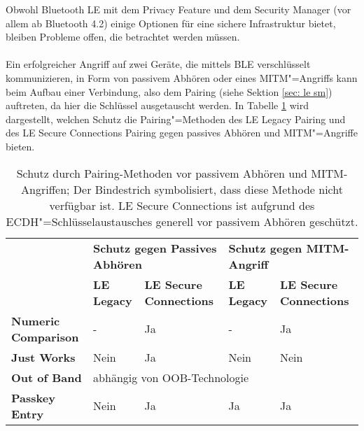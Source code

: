 Obwohl Bluetooth LE mit dem Privacy Feature und dem Security Manager (vor allem ab Bluetooth 4.2) einige Optionen für eine sichere Infrastruktur bietet, bleiben Probleme offen, die betrachtet werden müssen.
\\\\
Ein erfolgreicher Angriff auf zwei Geräte, die mittels BLE verschlüsselt kommunizieren, in Form von passivem Abhören oder eines MITM"=Angriffs kann beim Aufbau einer Verbindung, also dem Pairing (siehe Sektion \ref{sec: le sm}) auftreten, da hier die Schlüssel ausgetauscht werden. In Tabelle \ref{tab: le sicherheit zusammenfassung}
wird dargestellt, welchen Schutz die Pairing"=Methoden des LE Legacy Pairing und des LE Secure Connections Pairing gegen passives Abhören und MITM"=Angriffe bieten.

\begin{table}
    \begin{tabularx}{\textwidth}{|p{2.8cm}|p{2cm}|p{3cm}|p{2cm}|p{3cm}|}
        \hline
        & \multicolumn{2}{X|}{\textbf{Schutz gegen Passives Abhören}} & \multicolumn{2}{X|}{\textbf{Schutz gegen MITM-Angriff}} \\
        & \textbf{LE Legacy} & \textbf{LE Secure Connections} & \textbf{LE Legacy} & \textbf{LE Secure Connections} \\
        \hline
        \textbf{Numeric Comparison} & - & Ja & - & Ja \cite{BtSpec4.2_2309} \\
        \hline
        \textbf{Just Works} & Nein \cite{BtSpec4.2_2304_b} & Ja \cite{BtSpec4.2_245} & Nein \cite{BtSpec4.2_2304_b} & Nein \cite{BtSpec4.2_245} \\
        \hline
        \textbf{Out of Band} & \multicolumn{4}{|l|}{abhängig von OOB-Technologie \cite{BtSpec4.2_2305} \cite{BtSpec4.2_2312-2313}} \\
        \hline
        \textbf{Passkey Entry} & Nein \cite{BtSpec4.2_2304} & Ja & Ja \cite{BtSpec4.2_2304} & Ja \cite{BtSpec4.2_2311}\\
        \hline
    \end{tabularx}
    \caption[Schutz durch Pairing-Methoden vor passivem Abhören und MITM]{Schutz durch Pairing-Methoden vor passivem Abhören und MITM-Angriffen; Der Bindestrich symbolisiert, dass diese Methode nicht verfügbar ist. LE Secure Connections ist aufgrund des ECDH"=Schlüsselaustausches \cite{BtSpec4.2_2307} generell vor passivem Abhören geschützt.}
    \label{tab: le sicherheit zusammenfassung}
\end{table}
